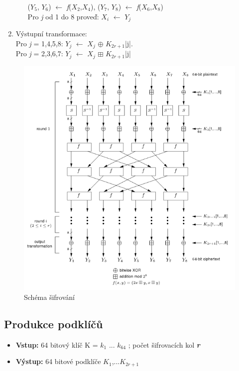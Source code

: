 \documentclass[12pt,a4paper]{article}
\begin{document}
\begin{enumerate}
\begin{enumerate}
($Y_{5}$, $Y_{6}$) $\leftarrow$ \emph{f}($X_{2}$,$X_{4}$), ($Y_{7}$, $Y_{8}$) $\leftarrow$ \emph{f}($X_{6}$,$X_{8}$)\\
Pro \emph{j} od 1 do 8 proveď: $X_{i}$ $\leftarrow$ $Y_{j}$
\end{enumerate}

\item Výstupní transformace:\\
Pro \emph{j} = 1,4,5,8: $Y_{j}$ $\leftarrow$ $X_{j}$ $\oplus$ $K_{2r+1}$|j|.\\
Pro \emph{j} = 2,3,6,7: $Y_{j}$ $\leftarrow$ $X_{j}$ $\boxplus$ $K_{2r+1}$|j|
\end{enumerate}

\begin{figure}
    \center
    \includegraphics[width=120mm]{img/saferschema.png}
    \caption{Schéma šifrování}
\end{figure}


{\subsection{Produkce podklíčů}}
\begin{itemize}
\item \textbf{Vstup:} 64 bitový klíč K = $k_{1}$ ... $k_{64}$ ; počet šifrovacích kol \textbf{\emph{r}}
\item \textbf{Výstup:} 64 bitové podklíče $K_{1}$,...$K_{2r+1}$
\end{itemize}
\end{document}
